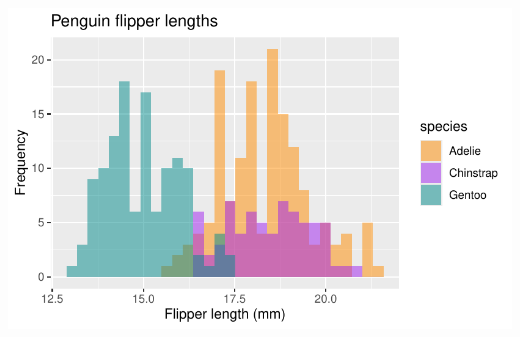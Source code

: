 \documentclass[
  letterpaper,
  DIV=11,
  numbers=noendperiod]{scrreprt}
\begin{document}
\includegraphics{scripts/02_dataViz/class4_files/figure-pdf/unnamed-chunk-9-1.pdf}
\end{document}
